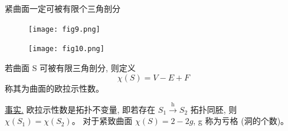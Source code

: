 \documentclass[lang=cn,10pt,thmcnt=section]{elegantbook}
\begin{document}
\begin{theorem}
     紧曲面一定可被有限个三角剖分
\end{theorem}

\begin{figure}[htbp]
    \centering
    \texttt{[image: fig9.png]} %
\end{figure}

\begin{figure}[htbp]
    \centering
    \texttt{[image: fig10.png]} %
\end{figure}

\begin{definition}[欧拉示性数]
    若曲面 S 可被有限三角剖分, 则定义
$$ \chi(S) = V-E+F $$
称其为曲面的欧拉示性数。
\end{definition}
\underline{事实.} 欧拉示性数是拓扑不变量,
即若存在 $S_1 \xrightarrow{\text{h}} S_2$ 拓扑同胚, 则 $\chi(S_1) = \chi(S_2)$。
对于紧致曲面 $\chi(S)=2-2g$, g 称为亏格 (洞的个数)。
\end{document}
